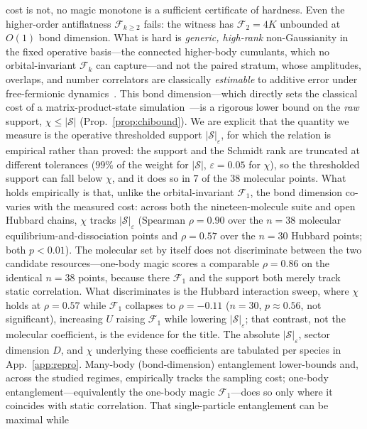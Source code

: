 cost is not, no magic monotone is a sufficient certificate of hardness. Even the higher-order
antiflatness $\mathcal F_{k\ge2}$ fails: the witness has $\mathcal F_2=4K$ unbounded at $O(1)$ bond
dimension. What is hard is \emph{generic, high-rank} non-Gaussianity in the fixed operative basis---the
connected higher-body cumulants, which no orbital-invariant $\mathcal F_k$ can capture---and not the
paired stratum, whose amplitudes, overlaps, and number correlators are classically \emph{estimable} to
additive error under free-fermionic dynamics~\cite{oh2026}.
This bond dimension---which directly sets the classical cost of a matrix-product-state
simulation~\cite{schollwock2011}---is a rigorous lower bound on the \emph{raw} support,
$\chi\le|\mathcal S|$ (Prop.~\ref{prop:chibound}). We are explicit that the quantity we measure is the
operative thresholded support $|\mathcal S|_\varepsilon$, for which the relation is empirical rather than
proved: the support and the Schmidt rank are truncated at different tolerances ($99\%$ of the weight for
$|\mathcal S|$, $\varepsilon=0.05$ for $\chi$), so the thresholded support can fall below $\chi$, and it
does so in $7$ of the $38$ molecular points. What holds empirically is that, unlike the orbital-invariant
$\mathcal F_1$, the bond dimension co-varies with the measured cost: across both the nineteen-molecule
suite and open Hubbard chains, $\chi$ tracks $|\mathcal S|_\varepsilon$ (Spearman $\rho=0.90$ over the
$n=38$ molecular equilibrium-and-dissociation points and $\rho=0.57$ over the $n=30$ Hubbard points; both
$p<0.01$). The molecular set by itself does not discriminate between the two candidate resources---one-body
magic scores a comparable $\rho=0.86$ on the identical $n=38$ points, because there $\mathcal F_1$ and the
support both merely track static correlation. What discriminates is the Hubbard interaction sweep, where
$\chi$ holds at $\rho=0.57$ while $\mathcal F_1$ collapses to $\rho=-0.11$ ($n=30$, $p\approx0.56$, not
significant), increasing $U$ raising $\mathcal F_1$ while lowering $|\mathcal S|_\varepsilon$; that
contrast, not the molecular coefficient, is the evidence for the title. The absolute
$|\mathcal S|_\varepsilon$, sector dimension $D$, and $\chi$ underlying these coefficients are tabulated
per species in App.~\ref{app:repro}. Many-body
(bond-dimension) entanglement lower-bounds and, across the studied regimes, empirically tracks the
sampling cost; one-body entanglement---equivalently the one-body magic $\mathcal F_1$---does so only
where it coincides with static correlation. That single-particle entanglement can be maximal while

